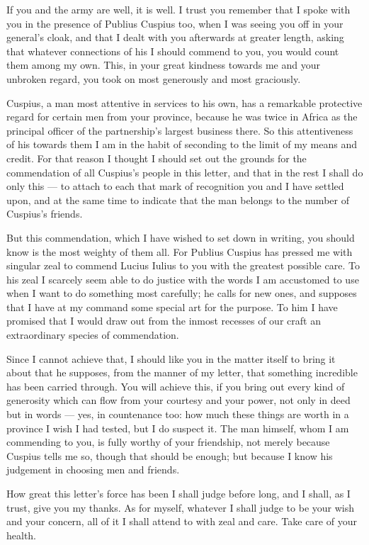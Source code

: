 

 If you and the army are well, it is well. I trust you remember that I spoke with you in the presence of Publius Cuspius too, when I was seeing you off in your general's cloak, and that I dealt with you afterwards at greater length, asking that whatever connections of his I should commend to you, you would count them among my own. This, in your great kindness towards me and your unbroken regard, you took on most generously and most graciously.

 Cuspius, a man most attentive in services to his own, has a remarkable protective regard for certain men from your province, because he was twice in Africa as the principal officer of the partnership's largest business there. So this attentiveness of his towards them I am in the habit of seconding to the limit of my means and credit. For that reason I thought I should set out the grounds for the commendation of all Cuspius's people in this letter, and that in the rest I shall do only this --- to attach to each that mark of recognition you and I have settled upon, and at the same time to indicate that the man belongs to the number of Cuspius's friends.

 But this commendation, which I have wished to set down in writing, you should know is the most weighty of them all. For Publius Cuspius has pressed me with singular zeal to commend Lucius Iulius to you with the greatest possible care. To his zeal I scarcely seem able to do justice with the words I am accustomed to use when I want to do something most carefully; he calls for new ones, and supposes that I have at my command some special art for the purpose. To him I have promised that I would draw out from the inmost recesses of our craft an extraordinary species of commendation.

 Since I cannot achieve that, I should like you in the matter itself to bring it about that he supposes, from the manner of my letter, that something incredible has been carried through. You will achieve this, if you bring out every kind of generosity which can flow from your courtesy and your power, not only in deed but in words --- yes, in countenance too: how much these things are worth in a province I wish I had tested, but I do suspect it. The man himself, whom I am commending to you, is fully worthy of your friendship, not merely because Cuspius tells me so, though that should be enough; but because I know his judgement in choosing men and friends.

 How great this letter's force has been I shall judge before long, and I shall, as I trust, give you my thanks. As for myself, whatever I shall judge to be your wish and your concern, all of it I shall attend to with zeal and care. Take care of your health.
